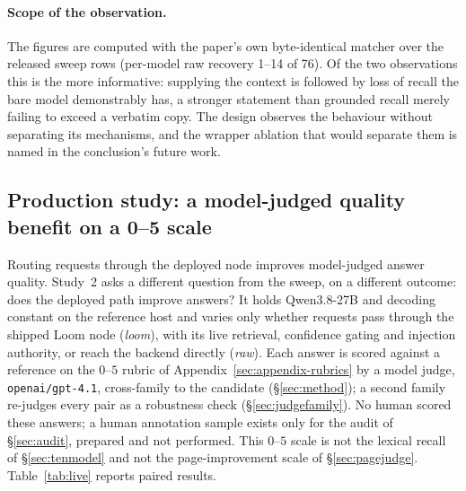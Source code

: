 \documentclass[10pt,twocolumn]{article}
\begin{document}
\paragraph{Scope of the observation.} The figures are computed with the paper's own byte-identical matcher over the released sweep rows (per-model raw recovery 1--14 of 76). Of the two observations this is the more informative: supplying the context is followed by loss of recall the bare model demonstrably has, a stronger statement than grounded recall merely failing to exceed a verbatim copy. The design observes the behaviour without separating its mechanisms, and the wrapper ablation that would separate them is named in the conclusion's future work.

\subsection{Production study: a model-judged quality benefit on a 0--5 scale}\label{sec:live}
Routing requests through the deployed node improves model-judged answer quality. Study~2 asks a different question from the sweep, on a different outcome: does the deployed path improve answers? It holds Qwen3.8-27B and decoding constant on the reference host and varies only whether requests pass through the shipped Loom node (\emph{loom}), with its live retrieval, confidence gating and injection authority, or reach the backend directly (\emph{raw}). Each answer is scored against a reference on the $0$--$5$ rubric of Appendix~\ref{sec:appendix-rubrics} by a model judge, \texttt{openai/gpt-4.1}, cross-family to the candidate (\S\ref{sec:method}); a second family re-judges every pair as a robustness check (\S\ref{sec:judgefamily}). No human scored these answers; a human annotation sample exists only for the audit of \S\ref{sec:audit}, prepared and not performed. This $0$--$5$ scale is not the lexical recall of \S\ref{sec:tenmodel} and not the page-improvement scale of \S\ref{sec:pagejudge}. Table~\ref{tab:live} reports paired results.
\end{document}
